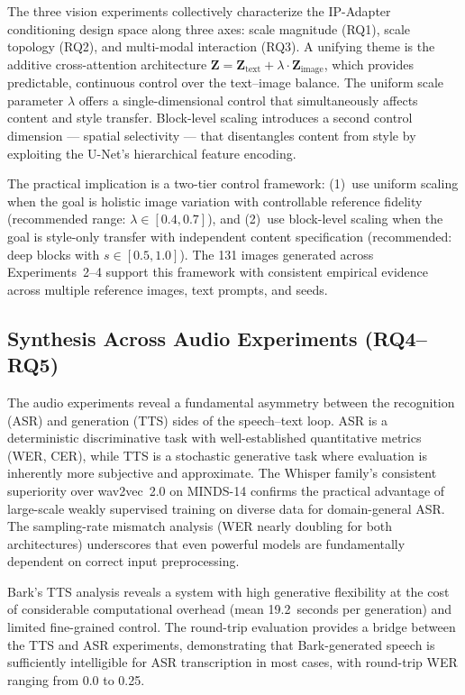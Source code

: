 \documentclass[conference]{IEEEtran}
\newcommand{\ipadapter}{IP-Adapter}
\begin{document}
The three vision experiments collectively characterize the \ipadapter{} conditioning design space along three axes: scale magnitude (RQ1), scale topology (RQ2), and multi-modal interaction (RQ3). A unifying theme is the additive cross-attention architecture \(\mathbf{Z} = \mathbf{Z}_{\text{text}} + \lambda \cdot \mathbf{Z}_{\text{image}}\), which provides predictable, continuous control over the text--image balance. The uniform scale parameter \(\lambda\) offers a single-dimensional control that simultaneously affects content and style transfer. Block-level scaling introduces a second control dimension --- spatial selectivity --- that disentangles content from style by exploiting the U-Net's hierarchical feature encoding.

The practical implication is a two-tier control framework: (1)~use uniform scaling when the goal is holistic image variation with controllable reference fidelity (recommended range: \(\lambda \in [0.4, 0.7]\)), and (2)~use block-level scaling when the goal is style-only transfer with independent content specification (recommended: deep blocks with \(s \in [0.5, 1.0]\)). The 131 images generated across Experiments~2--4 support this framework with consistent empirical evidence across multiple reference images, text prompts, and seeds.

\subsection{Synthesis Across Audio Experiments (RQ4--RQ5)}

The audio experiments reveal a fundamental asymmetry between the recognition (ASR) and generation (TTS) sides of the speech--text loop. ASR is a deterministic discriminative task with well-established quantitative metrics (WER, CER), while TTS is a stochastic generative task where evaluation is inherently more subjective and approximate. The Whisper family's consistent superiority over wav2vec~2.0 on MINDS-14 confirms the practical advantage of large-scale weakly supervised training on diverse data for domain-general ASR. The sampling-rate mismatch analysis (WER nearly doubling for both architectures) underscores that even powerful models are fundamentally dependent on correct input preprocessing.

Bark's TTS analysis reveals a system with high generative flexibility at the cost of considerable computational overhead (mean 19.2~seconds per generation) and limited fine-grained control. The round-trip evaluation provides a bridge between the TTS and ASR experiments, demonstrating that Bark-generated speech is sufficiently intelligible for ASR transcription in most cases, with round-trip WER ranging from 0.0 to 0.25.
\end{document}
